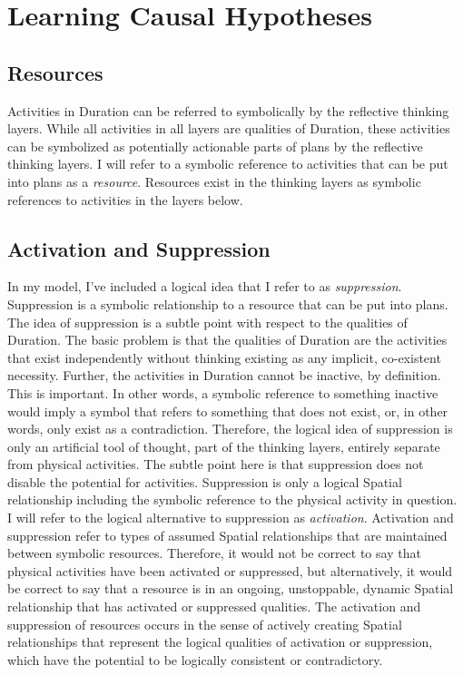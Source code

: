 \chapter{Learning Causal Hypotheses}
\label{chapter:learning_causal_hypotheses}

\section{Resources}

Activities in Duration can be referred to symbolically by the
reflective thinking layers.  While all activities in all layers are
qualities of Duration, these activities can be symbolized as
potentially actionable parts of plans by the reflective thinking
layers.  I will refer to a symbolic reference to activities that can
be put into plans as a \emph{resource}.  Resources exist in the
thinking layers as symbolic references to activities in the layers
below.

\section{Activation and Suppression}

In my model, I've included a logical idea that I refer to as
\emph{suppression}.  Suppression is a symbolic relationship to a
resource that can be put into plans.  The idea of suppression is a
subtle point with respect to the qualities of Duration.  The basic
problem is that the qualities of Duration are the activities that
exist independently without thinking existing as any implicit,
co-existent necessity.  Further, the activities in Duration cannot be
inactive, by definition.  This is important.  In other words, a
symbolic reference to something inactive would imply a symbol that
refers to something that does not exist, or, in other words, only
exist as a contradiction.  Therefore, the logical idea of suppression
is only an artificial tool of thought, part of the thinking layers,
entirely separate from physical activities.  The subtle point here is
that suppression does not disable the potential for activities.
Suppression is only a logical Spatial relationship including the
symbolic reference to the physical activity in question.  I will refer
to the logical alternative to suppression as \emph{activation}.
Activation and suppression refer to types of assumed Spatial
relationships that are maintained between symbolic resources.
Therefore, it would not be correct to say that physical activities
have been activated or suppressed, but alternatively, it would be
correct to say that a resource is in an ongoing, unstoppable, dynamic
Spatial relationship that has activated or suppressed qualities.  The
activation and suppression of resources occurs in the sense of
actively creating Spatial relationships that represent the logical
qualities of activation or suppression, which have the potential to be
logically consistent or contradictory.

